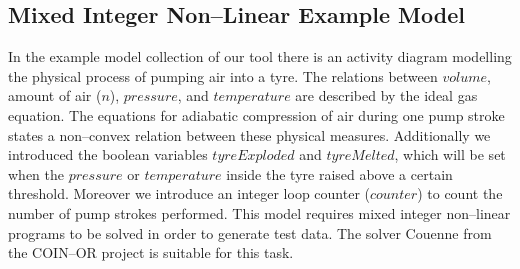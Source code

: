 \documentclass[runningheads,a4paper]{llncs}%
\begin{document}
\subsection{Mixed Integer Non--Linear Example Model}
\label{sec:exampleModelNonConvex}
In the example model collection of our tool there is an activity diagram modelling the physical process of pumping air into a tyre. The relations between $volume$, amount of air ($n$), $pressure$, and $temperature$ are described by the ideal gas equation. The equations for adiabatic compression of air during one pump stroke states a non--convex relation between these physical measures. Additionally we introduced the boolean variables $tyreExploded$ and $tyreMelted$, which will be set when the $pressure$ or $temperature$ inside the tyre raised above a certain threshold. Moreover we introduce an integer loop counter ($counter$) to count the number of pump strokes performed. This model requires mixed integer non--linear programs to be solved in order to generate test data. The solver Couenne \cite{Belotti09couenne} from the COIN--OR project is suitable for this task.%
\end{document}
